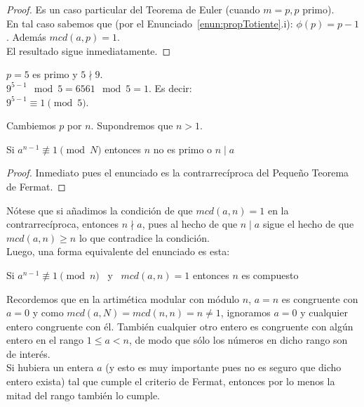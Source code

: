 \begin{proof}
Es un caso particular del Teorema de Euler (cuando $m=p, p$ primo).\\
En tal caso sabemos que (por el Enunciado~\ref{enun:propTotiente}.i): $\phi(p)=p-1$. Además $mcd(a, p)=1$.\\
El resultado sigue inmediatamente.
\end{proof}

\begin{ejemplo}
$p=5$ es primo y $5 \nmid 9$.\\
$9^{5-1} \mod 5=6561 \mod 5=1$. Es decir:\\
$9^{5-1} \equiv 1 \pmod 5$.
\end{ejemplo}

Cambiemos $p$ por $n$. Supondremos que $n>1$.

\begin{enunciado} \label{enun:contrarrteorFermat}\leavevmode\par
Si $a^{n-1} \not\equiv 1 \pmod N$ entonces $n$ no es primo o $n \mid a$
\end{enunciado}

\begin{proof}
Inmediato pues el enunciado es la contrarrecíproca del Pequeño Teorema de Fermat.
\end{proof}

Nótese que si añadimos la condición de que $mcd(a,n)=1$ en la contrarrecíproca, entonces $n \nmid a$, pues al hecho de que $n \mid a$ sigue el hecho de que $mcd(a,n) \geq n$ lo que contradice la condición. \\
Luego, una forma equivalente del enunciado es esta:

\begin{enunciado} \label{enun:criterioFermat}\leavevmode\par
Si $a^{n-1} \not\equiv 1 \pmod n$ \, y \, $mcd(a,n)=1$ entonces $n$ es compuesto 
\end{enunciado}

Recordemos que en la artimética modular con módulo $n$, $a=n$ es congruente con $a=0$ y como $mcd(a,N)=mcd(n,n)=n \neq 1$, ignoramos $a=0$ y cualquier entero congruente con él. También cualquier otro entero es congruente con algún entero en el rango $1 \leq a < n$, de modo que sólo los números en dicho rango son de interés. \\

Si hubiera un entera $a$ (y esto es muy importante pues no es seguro que dicho entero exista) tal que cumple el criterio de Fermat, entonces por lo menos la mitad del rango también lo cumple.

